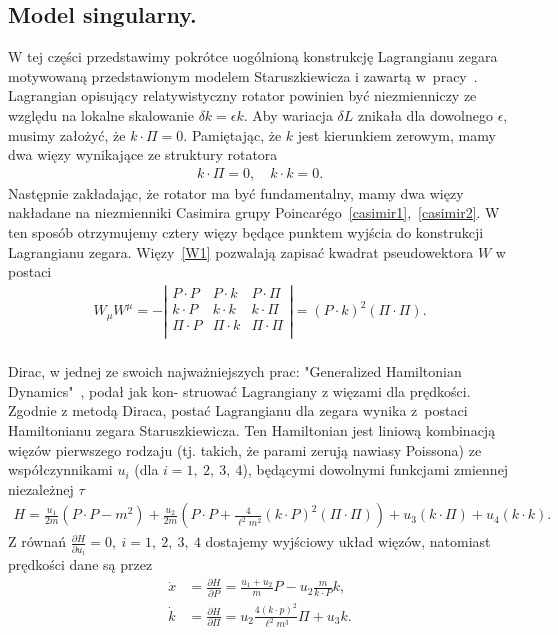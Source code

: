 \subsection{Model singularny.}
W tej części przedstawimy pokrótce uogólnioną konstrukcję 
Lagrangianu zegara motywowaną przedstawionym
 modelem Staruszkiewicza i zawartą w~pracy~\cite{Bratek2015wiele}.
Lagrangian opisujący relatywistyczny rotator powinien być 
niezmienniczy ze względu na lokalne skalowanie 
$\delta k =\epsilon k$. Aby wariacja 
$\delta L $ znikała dla dowolnego $\epsilon$, musimy założyć, że
 $k \cdot \Pi = 0$. Pamiętając, że $k$ jest kierunkiem zerowym, 
mamy dwa więzy wynikające ze struktury rotatora
\begin{align}\label{W1}
k \cdot \Pi = 0, \quad k \cdot k = 0. \tag{W1}
\end{align}
Następnie zakładając, że rotator ma być fundamentalny, 
mamy dwa więzy nakładane na niezmienniki Casimira 
grupy Poincarégo~\ref{casimir1},\ \ref{casimir2}.
W ten sposób otrzymujemy
cztery więzy będące punktem wyjścia
do konstrukcji Lagrangianu zegara.
Więzy~\eqref{W1} pozwalają zapisać kwadrat pseudowektora $W$ w postaci
\begin{align*}
W_\mu  W^\mu = 
-\left| 
\begin{array}{ccc}
P\cdot P& P \cdot k& P \cdot \Pi\\
k\cdot P& k \cdot k& k \cdot \Pi\\
\Pi \cdot P& \Pi \cdot k& \Pi \cdot \Pi\\
\end{array}
\right| = 
(P \cdot k)^2  (\Pi \cdot \Pi). \\
\end{align*}

Dirac, w jednej ze swoich najważniejszych prac: 
"Generalized Hamiltonian Dynamics"~\cite{DiracHam}, podał
jak kon- struować Lagrangiany z więzami dla prędkości.
Zgodnie z metodą Diraca, postać Lagrangianu dla zegara wynika 
z~postaci Hamiltonianu zegara Staruszkiewicza. Ten Hamiltonian
jest liniową kombinacją więzów pierwszego rodzaju (tj. 
takich, że parami zerują nawiasy Poissona) ze współczynnikami $u_i$ 
(dla $ i=1,\ 2,\ 3,\ 4$), będącymi dowolnymi
funkcjami zmiennej niezależnej $\tau$ 
\begin{align*}
H = \frac{u_1}{2m} \left(P\cdot P -m^2 \right) 
+ \frac{u_2}{2m } \left( P\cdot P + \frac{4}{\ell^2 m^2} (k\cdot P)^2 
(\Pi \cdot \Pi) \right)
+ u_3 (k \cdot \Pi ) + u_4 (k \cdot k).
\end{align*}
Z równań $\frac{\partial H}{\partial u_i} = 0 ,\ i=1,\ 2 ,\ 3,\ 4$ 
dostajemy wyjściowy
układ więzów, natomiast prędkości dane są przez
\begin{align*}
\dot{x} &= \frac{\partial H}{\partial P} = 
\frac{u_1 + u_2}{m}P - u_2 \frac{m}{k\cdot P} k,\\
\dot{k} &= \frac{\partial H}{\partial \Pi} =  
u_2\frac{4 (k\cdot p)^2}{\ell^2m^3}\Pi +u_3 k .
\end{align*}

